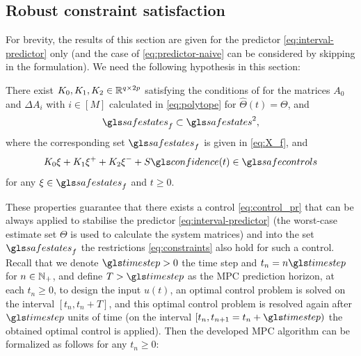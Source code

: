 \subsection{Robust constraint satisfaction}
\label{sec:stab-robust-control}

For brevity, the results of this section are given for the predictor
\eqref{eq:interval-predictor} only (and the case of \eqref{eq:predictor-naive}
can be considered by skipping  in the
formulation). We need the following hypothesis in this section:
\begin{assumption}
	\begin{leftbar}[assumptionbar]
	\label{assumpt:feasible-constr} There exist $K_{0},K_{1},K_{2}\in\mathbb{R}^{q\times2p}$	satisfying the conditions of  for the matrices	$A_{0}$ and $\Delta A_{i}$ with $i\in[M]$ calculated in \eqref{eq:polytope}	for $\hat{\Theta}(t)=\Theta$, and
	\[
	\safestates_{f}\subset\safestates^{2},
	\]
	where the corresponding set $\safestates_{f}$ is given in \eqref{eq:X_f}, and
	\[
	K_{0}\xi+K_{1}\xi^{+}+K_{2}\xi^{-}+S\confidence(t)\in\safecontrols
	\]
	for any $\xi\in\safestates_{f}$ and $t\geq0$.
	\end{leftbar}
\end{assumption}
These properties guarantee that there exists a control \eqref{eq:control_pr} that can be always applied to stabilise the predictor \eqref{eq:interval-predictor}
(the worst-case estimate set $\Theta$ is used to calculate the system matrices) and into the set $\safestates_{f}$ the restrictions \eqref{eq:constraints} also hold for such a control. Recall that we denote $\timestep>0$ the time step and $t_{n}=n\timestep$ for $n\in\mathbb{N}_{+}$, and define $T>\timestep $ as the \gls{MPC} prediction horizon, \ie at each $t_n\geq0$, to design
the input $u(t)$, an optimal control problem is solved on the interval $[t_n,t_n+T]$, and this optimal control problem is resolved again after $\timestep$ units of time (on the interval $[t_n,t_{n+1} = t_n+\timestep)$ the obtained
optimal control is applied). Then the developed \gls{MPC} algorithm can be formalized as follows for
any $t_{n}\geq0$:

